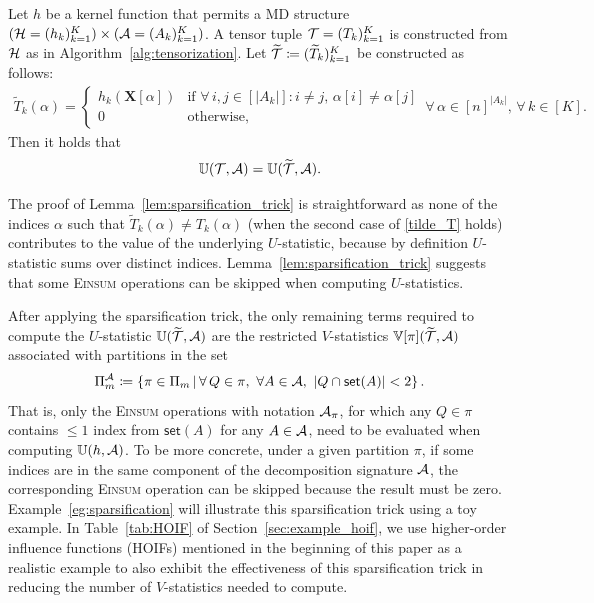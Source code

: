 \documentclass[letterpaper,11pt]{article}
\def\tilde{\widetilde}
\def\Einsum{\textsc{Einsum}}
\newcommand{\ustat}{\mathbb{U}}
\newcommand{\vstat}{\mathbb{V}}
\newcommand{\takesetp}[1]{\mathsf{set}(#1)}
\newcommand{\partition}{\Pi}
\newcommand{\partitionp}[1]{\partition_{#1}}
\begin{document}
\begin{bibunit}[plainnat]
\begin{lemma}\label{lem:sparsification_trick}
Let $h$ be a kernel function that permits a MD structure $({\mathcal{H}} = (h_k)_{k=1}^K) \times ({\mathcal{A}} = (A_k)_{k=1}^K)$. A tensor tuple ${\mathcal{T}} = (T_k)_{k = 1}^{K}$ is constructed from ${\mathcal{H}}$ as in Algorithm~\ref{alg:tensorization}. Let $\tilde{\calT} \coloneqq (\tilde{T}_k)_{k=1}^K$ be constructed as follows:
\begin{equation}
\label{tilde_T}
\begin{split}
\tilde{T}_k (\alpha) = 
\begin{cases}
h_k (\bm{X}[\alpha]) & \text{if } \forall \, i,j \in [|A_k|]: i \neq j, \, \alpha [i] \neq \alpha [j] \\
0 & \text{otherwise}, 
\end{cases}
\, \forall \, \alpha \in [n]^{|A_k|}, \, \forall \, k \in [K]. 
\end{split}
\end{equation}
Then it holds that
\begin{equation*}
\ustat(\calT, \calA) = \ustat(\tilde{\calT}, \calA).   
\end{equation*}
\end{lemma}

The proof of Lemma~\ref{lem:sparsification_trick} is straightforward as none of the indices $\alpha$ such that $\tilde{T}_{k} (\alpha) \neq T_{k} (\alpha)$ (when the second case of \eqref{tilde_T} holds) contributes to the value of the underlying $U$-statistic, because by definition $U$-statistic sums over distinct indices. Lemma~\ref{lem:sparsification_trick} suggests that some \Einsum{} operations can be skipped when computing $U$-statistics.

\begin{remark}\label{rem:sparsification_terms_revised}
After applying the sparsification trick, the only remaining terms required to compute the $U$-statistic $\ustat(\widetilde{\calT}, \calA)$ are the restricted $V$-statistics $\vstat[\pi](\widetilde{\calT}, \calA)$ associated with partitions in the set
\begin{equation}
\label{eq:quotient_set}
\partition_m^\calA \coloneqq \left\{ \pi \in \partitionp{m} \,\middle|\, \forall \, Q \in \pi,\ \forall A \in \calA,\ |Q \cap \takesetp{A}| < 2 \right\}.
\end{equation}
That is, only the \Einsum{} operations with notation ${\mathcal{A}}_\pi$, for which any $Q \in \pi$ contains $\leq 1$ index from $\takesetp{A}$ for any $A \in {\mathcal{A}}$, need to be evaluated when computing $\ustat(h, \calA)$.  To be more concrete, under a given partition $\pi$, if some indices are in the same component of the decomposition signature ${\mathcal{A}}$, the corresponding \Einsum{} operation can be skipped because the result must be zero. Example~\ref{eg:sparsification} will illustrate this sparsification trick using a toy example. In Table~\ref{tab:HOIF} of Section~\ref{sec:example_hoif}, we use higher-order influence functions (HOIFs) mentioned in the beginning of this paper as a realistic example to also exhibit the effectiveness of this sparsification trick in reducing the number of $V$-statistics needed to compute.
\end{remark}


\end{bibunit}
\end{document}
